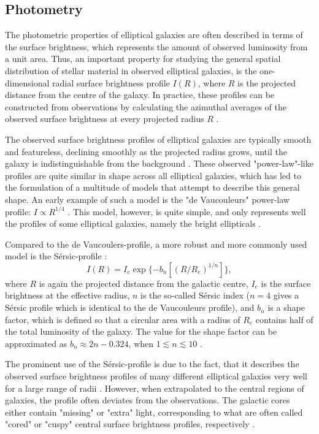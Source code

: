 \documentclass[english, twoside]{HYgradu}
\begin{document}
\subsection{Photometry} \label{section:ellip_photo}

The photometric properties of elliptical galaxies are often described in terms of the surface brightness, which represents the amount of observed luminosity from a unit area. Thus, an important property for studying the general spatial distribution of stellar material in observed elliptical galaxies, is the one-dimensional radial surface brightness profile $I(R)$, where $R$ is the projected distance from the centre of the galaxy. In practice, these profiles can be constructed from observations by calculating the azimuthal averages of the observed surface brightness at every projected radius $R$ \citep{MerrittBook}.

The observed surface brightness profiles of elliptical galaxies are typically smooth and featureless, declining smoothly as the projected radius grows, until the galaxy is indistinguishable from the background \citep{BinneyTremaine}. These observed "power-law"-like profiles are quite similar in shape across all elliptical galaxies, which has led to the formulation of a multitude of models that attempt to describe this general shape. An early example of such a model is the "de Vaucouleurs" power-law profile: $I \propto R^{1/4}$ \citep{deVaucouleurs1948}. This model, however, is quite simple, and only represents well the profiles of some elliptical galaxies, namely the bright ellipticals \citep{MerrittBook}. 

Compared to the de Vaucoulers-profile, a more robust and more commonly used model is the Sérsic-profile \citep{Sersic1968}:
\begin{equation}
I (R) = I_e \exp \{ -b_n \left[ (R / R_e)^{1/n} \right] \},
\end{equation}
where $R$ is again the projected distance from the galactic centre, $I_e$ is the surface brightness at the effective radius, $n$ is the so-called Sérsic index ($n=4$ gives a Sérsic profile which is identical to the de Vaucouleurs profile), and $b_n$ is a shape factor, which is defined so that a circular area with a radius of $R_e$ contains half of the total luminosity of the galaxy. The value for the shape factor can be approximated as $b_n \approx 2n - 0.324$, when $1 \lesssim n \lesssim 10$ \citep{BinneyTremaine}. 

The prominent use of the Sérsic-profile is due to the fact, that it describes the observed surface brightness profiles of many different elliptical galaxies very well for a large range of radii \citep{MerrittBook}. However, when extrapolated to the central regions of galaxies, the profile often deviates from the observations. The galactic cores either contain "missing" or "extra" light, corresponding to what are often called "cored" or "cuspy" central surface brightness profiles, respectively \citep[e.g.][]{Kormendy2009}.
\end{document}
